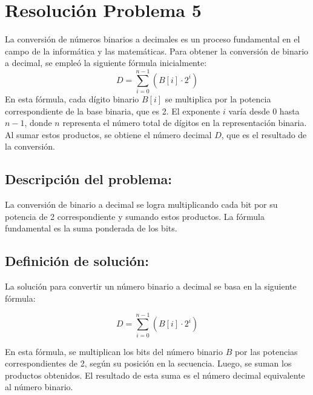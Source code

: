 \section{Resolución Problema 5}
La conversión de números binarios a decimales es un proceso fundamental en el campo de la informática y las matemáticas. Para obtener la conversión de binario a decimal, se empleó la siguiente fórmula inicialmente:
\begin{equation}
D = \sum_{i=0}^{n-1} (B[i] \cdot 2^i) 
\end{equation} 
En esta fórmula, cada dígito binario $B [i]$ se multiplica por la potencia correspondiente de la base binaria, que es 2. El exponente $i$ varía desde 0 hasta $n-1$, donde $n$ representa el número total de dígitos en la representación binaria. Al sumar estos productos, se obtiene el número decimal $D$, que es el resultado de la conversión. 
\subsection{\textbf{Descripción del problema:}}
La conversión de binario a decimal se logra multiplicando cada bit por su potencia de 2 correspondiente y sumando estos productos. La fórmula fundamental es la suma ponderada de los bits.
\subsection{\textbf{Definición de solución:}}
La solución para convertir un número binario a decimal se basa en la siguiente fórmula:

\begin{equation}
D = \sum_{i=0}^{n-1} (B[i] \cdot 2^i)
\end{equation}

En esta fórmula, se multiplican los bits del número binario $B$ por las potencias correspondientes de 2, según su posición en la secuencia. Luego, se suman los productos obtenidos. El resultado de esta suma es el número decimal equivalente al número binario.
